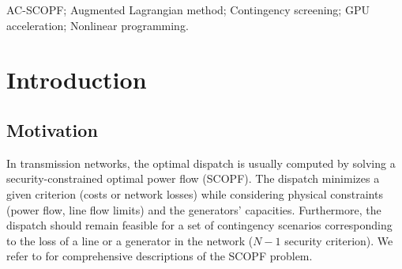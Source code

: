 \documentclass{IEEEtran4PSCC}
\begin{document}
\begin{abstract}
  We present a new algorithm for solving large-scale security-constrained optimal power flow in polar form (AC-SCOPF). The method builds on Nonlinearly Constrained augmented Lagrangian (NCL), an augmented Lagrangian method in which the subproblems are solved using an interior-point method. NCL has two key advantages for large-scale SCOPF. First, NCL handles difficult problems such as infeasible ones or models with complementarity constraints. Second, the augmented Lagrangian term naturally regularizes the Newton linear systems within the interior-point method, enabling solution of the Newton systems with a pivoting-free factorization that can be efficiently parallelized on GPUs. We assess the performance of our implementation, called MadNCL, on large-scale corrective AC-SCOPFs, with complementarity constraints modeling the corrective actions. Numerical results show that MadNCL can solve AC-SCOPF with 500 buses and 256 contingencies fully on the GPU in less than 3 minutes, whereas Knitro takes more than 3 hours to find an equivalent solution.
\end{abstract}

\begin{IEEEkeywords}
  AC-SCOPF;
  Augmented Lagrangian method;
  Contingency screening;
  GPU acceleration;
  Nonlinear programming.
\end{IEEEkeywords}




\section{Introduction}
\subsection{Motivation}
In transmission networks, the optimal dispatch is usually computed by solving
a security-constrained optimal power flow (SCOPF). The dispatch
minimizes a given criterion (costs or network losses) while considering
physical constraints (power flow, line flow limits) and the generators' capacities.
Furthermore, the dispatch should remain feasible
for a set of contingency scenarios corresponding to the loss of a line or a generator in the network ($N-1$ security criterion).
We refer to \cite{stott2005security,frank2016introduction} for comprehensive descriptions of the SCOPF problem.
\end{document}
